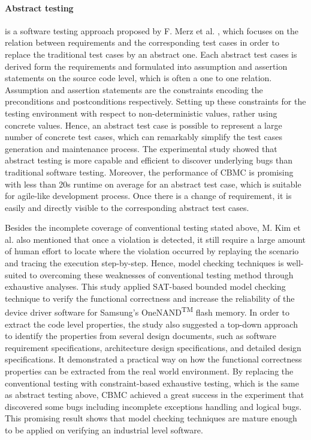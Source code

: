 \paragraph{Abstract testing} is a software testing approach proposed by F. Merz et al. \cite{Merz:2015:BGT:2837773.2837824}, which focuses on the relation between requirements and the corresponding test cases in order to replace the traditional test cases by an abstract one. Each abstract test cases is derived form the requirements and formulated into assumption and assertion statements on the source code level, which is often a one to one relation. Assumption and assertion statements are the constraints encoding the preconditions and postconditions respectively. Setting up these constraints for the testing environment with respect to non-deterministic values, rather using concrete values. Hence, an abstract test case is possible to represent a large number of concrete test cases, which can remarkably simplify the test cases generation and maintenance process. The experimental study showed that abstract testing is more capable and efficient to discover underlying bugs than traditional software testing. Moreover, the performance of CBMC is promising with less than 20s runtime on average for an abstract test case, which is suitable for agile-like development process. Once there is a change of requirement, it is easily and directly visible to the corresponding abstract test cases.

Besides the incomplete coverage of conventional testing stated above, M. Kim et al. \cite{4639323, Kim:2008:FVF:1429078.1429092, 5510242} also mentioned that once a violation is detected, it still require a large amount of human effort to locate where the violation occurred by replaying the scenario and tracing the execution step-by-step. Hence, model checking techniques is well-suited to overcoming these weaknesses of conventional testing method through exhaustive analyses. This study applied SAT-based bounded model checking technique to verify the functional correctness and increase the reliability of the device driver software for Samsung's OneNAND\textsuperscript{TM} flash memory. In order to extract the code level properties, the study also suggested a top-down approach to identify the properties from several design documents, such as software requirement specifications, architecture design specifications, and detailed design specifications. It demonstrated a practical way on how the functional correctness properties can be extracted from the real world environment. By replacing the conventional testing with constraint-based exhaustive testing, which is the same as abstract testing above, CBMC achieved a great success in the experiment that discovered some bugs including incomplete exceptions handling and logical bugs. This promising result shows that model checking techniques are mature enough to be applied on verifying an industrial level software.

